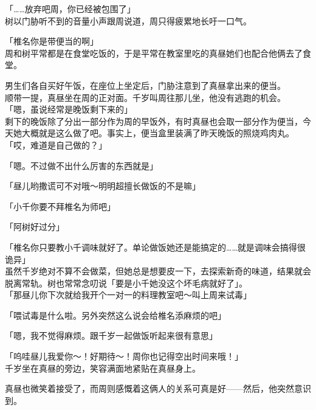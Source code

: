 「……放弃吧周，你已经被包围了」\\

树以门胁听不到的音量小声跟周说道，周只得疲累地长吁一口气。\\

\vspace{2\baselineskip}

「椎名你是带便当的啊」\\

周和树平常都是在食堂吃饭的，于是平常在教室里吃的真昼她们也配合他俩去了食堂。

男生们各自买好午饭，在座位上坐定后，门胁注意到了真昼拿出来的便当。\\

顺带一提，真昼坐在周的正对面。千岁叫周往那儿坐，他没有逃跑的机会。\\

「嗯，虽说经常是晚饭剩下来的」\\

剩下的晚饭除了分出一部分作为周的早饭外，有时真昼也会取一部分作为便当，今天她大概就是这么做了吧。事实上，便当盒里装满了昨天晚饭的照烧鸡肉丸。\\

「哎，难道是自己做的？」

「嗯。不过做不出什么厉害的东西就是」

「昼儿哟撒谎可不对哦～明明超擅长做饭的不是嘛」

「小千你要不拜椎名为师吧」

「阿树好过分」

「椎名你只要教小千调味就好了。单论做饭她还是能搞定的……就是调味会搞得很诡异」\\

虽然千岁绝对不算不会做菜，但她总是想要皮一下，去探索新奇的味道，结果就会脱离常轨。树也常常念叨说「要是小千她没这个坏毛病就好了」。\\

「那昼儿你下次就给我开个一对一的料理教室吧～叫上周来试毒」

「喂试毒是什么啦。另外突然这么说会给椎名添麻烦的吧」

「嗯，我不觉得麻烦。跟千岁一起做饭听起来很有意思」

「呜哇昼儿我爱你～！好期待～！周你也记得空出时间来哦！」\\

千岁坐在真昼的旁边，笑容满面地紧贴在真昼身上。

真昼也微笑着接受了，而周则感慨着这俩人的关系可真是好——然后，他突然意识到。\\

